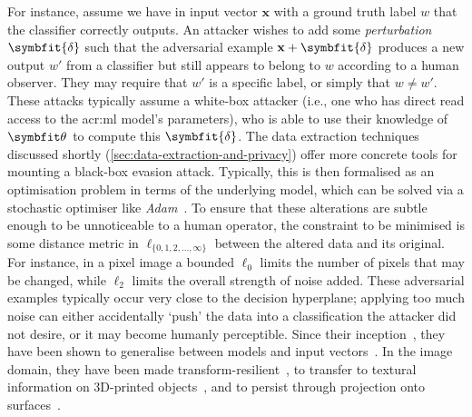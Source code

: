 For instance, assume we have in input vector $\mathbf{x}$ with a ground truth label $w$ that the classifier correctly outputs.
An attacker wishes to add some \emph{perturbation} $\symbfit{\delta}$ such that the adversarial example $\mathbf{x}+\symbfit{\delta}$ produces a new output $w'$ from a classifier but still appears to belong to $w$ according to a human observer.
They may require that $w'$ is a specific label, or simply that $w \ne w'$.
These attacks typically assume a white-box attacker (i.e., one who has direct read access to the \gls{acr:ml} model's parameters), who is able to use their knowledge of $\wvec{}$ to compute this $\symbfit{\delta}$.
The data extraction techniques discussed shortly (\cref{sec:data-extraction-and-privacy}) offer more concrete tools for mounting a black-box evasion attack.
Typically, this is then formalised as an optimisation problem in terms of the underlying model, which can be solved via a stochastic optimiser like \emph{Adam}~\parencite{DBLP:journals/corr/KingmaB14}.
To ensure that these alterations are subtle enough to be unnoticeable to a human operator, the constraint to be minimised is some distance metric in $\ell_{\{0,1,2,...,\infty\}}$ between the altered data and its original.
For instance, in a pixel image a bounded $\ell_0$ limits the number of pixels that may be changed, while $\ell_2$ limits the overall strength of noise added.
These adversarial examples typically occur very close to the decision hyperplane; applying too much noise can either accidentally `push' the data into a classification the attacker did not desire, or it may become humanly perceptible.
Since their inception~\parencite{DBLP:journals/corr/SzegedyZSBEGF13}, they have been shown to generalise between models and input vectors~\parencite{DBLP:journals/corr/GoodfellowSS14}.
In the image domain, they have been made transform-resilient~\parencite{DBLP:journals/corr/KurakinGB16}, to transfer to textural information on 3D-printed objects~\parencite{DBLP:journals/corr/AthalyeS17}, and to persist through projection onto surfaces~\parencite{DBLP:journals/corr/abs-2108-06247}.


